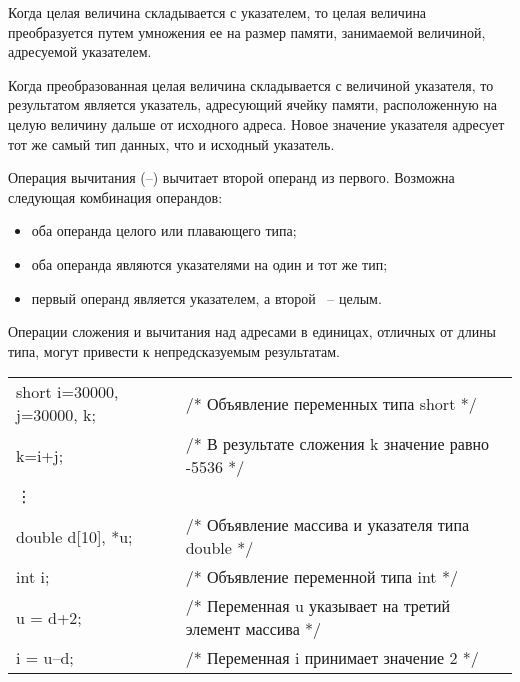 Когда целая величина складывается с указателем, то целая величина преобразуется путем умножения ее на размер памяти, занимаемой величиной, адресуемой указателем. \killoverfullbefore

Когда преобразованная целая величина складывается с величиной указателя, то результатом является указатель, адресующий ячейку памяти, расположенную на целую величину дальше от исходного адреса. Новое значение указателя адресует тот же самый тип данных, что и исходный указатель. \killoverfullbefore \BL

Операция вычитания ({--}) вычитает второй операнд из первого. Возможна следующая комбинация операндов: 
\begin{itemize}
\item оба операнда целого или плавающего типа;  
\item оба операнда являются указателями на один и тот же тип;  
\item первый операнд является указателем, а второй ~-- целым. \killoverfullbefore \BL
\end{itemize}

Операции сложения и вычитания над адресами в единицах, отличных от длины типа, могут привести к непредсказуемым результатам.\killoverfullbefore \BL 

\begin{pExample}
\begin{tabular}{ l l }
short i=30000, j=30000, k;  & \textcolor{exComm}{/* Объявление переменных типа short */} \\
k=i+j;  & \textcolor{exComm}{/* В результате сложения k значение равно -5536 */} \\
\vdots  & \textcolor{exComm}{ } \\
double d[10], *u; & \textcolor{exComm}{/* Объявление массива и указателя типа double */} \\
int i;  & \textcolor{exComm}{/* Объявление переменной типа int */} \\
u = d+2; & \textcolor{exComm}{/* Переменная u указывает на третий элемент массива */} \\
i = u{--}d; & \textcolor{exComm}{/* Переменная i принимает значение 2 */} \\
\end{tabular}
\end{pExample}

\clearpage

